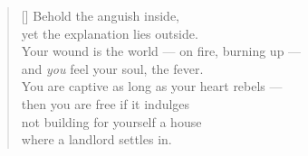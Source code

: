 \documentclass[a4paper,12pt,twoside,final]{book}
\begin{document}
\newpage


\settowidth{\versewidth}{Your wound is the world --- on fire, burning up ---}

\begin{verse}[\versewidth]
  Behold the anguish inside, \\
  yet the explanation lies outside. \\
  Your wound is the world --- on fire, burning up --- \\
  and \emph{you} feel your soul, the fever. \\
  You are captive as long as your heart rebels --- \\
  then you are free if it indulges \\
  not building for yourself a house \\
  where a landlord settles in.
\end{verse}


\newpage

\settowidth{\versewidth}{nem raksz magadnak olyan házat,}
\end{document}
